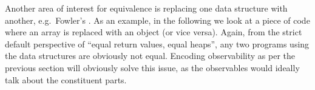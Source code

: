 Another area of interest for equivalence is replacing one data structure with another,
e.g.\ Fowler's \cite{needed}.
As an example, in the following we look at a piece of code where an array is replaced with an object (or vice versa).
Again, from the strict default perspective of ``equal return values, equal heaps'', any two programs using the data structures are obviously not equal.
Encoding observability as per the previous section will obviously solve this issue, as the observables would ideally talk about the constituent parts.




